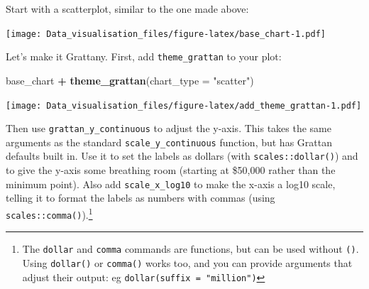 \documentclass[]{book}
\newenvironment{Shaded}{\begin{snugshade}}{\end{snugshade}}
\newcommand{\DataTypeTok}[1]{\textcolor[rgb]{0.13,0.29,0.53}{#1}}
\newcommand{\FloatTok}[1]{\textcolor[rgb]{0.00,0.00,0.81}{#1}}
\newcommand{\KeywordTok}[1]{\textcolor[rgb]{0.13,0.29,0.53}{\textbf{#1}}}
\newcommand{\NormalTok}[1]{#1}
\newcommand{\OperatorTok}[1]{\textcolor[rgb]{0.81,0.36,0.00}{\textbf{#1}}}
\newcommand{\StringTok}[1]{\textcolor[rgb]{0.31,0.60,0.02}{#1}}
\begin{document}
Start with a scatterplot, similar to the one made above:

\begin{Shaded}
\end{Shaded}

\texttt{[image: Data\_visualisation\_files/figure-latex/base\_chart-1.pdf]}

Let's make it Grattany. First, add \texttt{theme\_grattan} to your plot:

\begin{Shaded}
\begin{Highlighting}[]
\NormalTok{base_chart }\OperatorTok{+}
\StringTok{        }\KeywordTok{theme_grattan}\NormalTok{(}\DataTypeTok{chart_type =} \StringTok{"scatter"}\NormalTok{)}
\end{Highlighting}
\end{Shaded}

\texttt{[image: Data\_visualisation\_files/figure-latex/add\_theme\_grattan-1.pdf]}

Then use \texttt{grattan\_y\_continuous} to adjust the y-axis. This takes the same arguments as the standard \texttt{scale\_y\_continuous} function, but has Grattan defaults built in. Use it to set the labels as dollars (with \texttt{scales::dollar()}) and to give the y-axis some breathing room (starting at \$50,000 rather than the minimum point).
Also add \texttt{scale\_x\_log10} to make the x-axis a log10 scale, telling it to format the labels as numbers with commas (using \texttt{scales::comma()}).\footnote{The \texttt{dollar} and \texttt{comma} commands are functions, but can be used without \texttt{()}. Using \texttt{dollar()} or \texttt{comma()} works too, and you can provide arguments that adjust their output: eg \texttt{dollar(suffix\ =\ "million")}}
\end{document}
